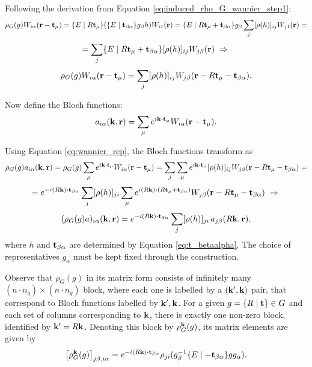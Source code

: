 Following the derivation from Equation \ref{eq:induced_rho_G_wannier_step1}:
$$
\rho_G(g) W_{i\alpha}({\vb{r}}-{\vb{t}}_\mu) =
\{ E \mid R{\vb{t}}_\mu \} \qty(\{ E \mid {\vb{t}}_{\beta\alpha} \} g_\beta h) W_{i1}({\vb{r}}) =
\{ E \mid R{\vb{t}}_\mu + {\vb{t}}_{\beta\alpha} \} g_\beta \sum_{j} [\rho(h)]_{ij} W_{j1}({\vb{r}}) =
$$
$$
= \sum_{j} \{ E \mid R{\vb{t}}_\mu + {\vb{t}}_{\beta\alpha} \} [\rho(h)]_{ij} W_{j\beta}({\vb{r}}) \; \Rightarrow \;
$$
\begin{equation} \label{eq:wannier_rep}
\rho_G(g) W_{i\alpha}({\vb{r}}-{\vb{t}}_\mu) = \sum_{j} [\rho(h)]_{ij} W_{j\beta}({\vb{r}} - R{\vb{t}}_\mu - {\vb{t}}_{\beta\alpha}).
\end{equation}

\n

Now define the Bloch functions:
\begin{equation} \label{eq:bloch_functions}
a_{i\alpha}(\k, \r) = \sum_{\mu} e^{i\k\vdot\t_\mu} W_{i\alpha}(\r-\t_\mu).
\end{equation}

Using Equation \ref{eq:wannier_rep}, the Bloch functions transform as
$$
\rho_G(g) a_{i\alpha}(\k,\r) =
\rho_G(g) \sum_{\mu} e^{i\k\vdot\t_\mu} W_{i\alpha}(\r-\t_\mu) =
\sum_{j} \sum_{\mu} e^{i\k\vdot\t_\mu} [\rho(h)]_{ij} W_{j\beta}(\r-R\t_\mu-\t_{\beta\alpha}) =
$$
$$
= e^{-i(R\k)\vdot\t_{\beta\alpha}} \sum_{j} [\rho(h)]_{ji} \sum_{\mu} e^{i(R\k)\vdot(R\t_\mu+\t_{\beta\alpha})} W_{j\beta}(\r-R\t_\mu-\t_{\beta\alpha}) \implies
$$
\begin{equation} \label{eq:bloch_rep}
(\rho_G(g) a)_{i\alpha}(\k,\r) = e^{-i(R\k)\vdot\t_{\beta\alpha}} \sum_{j} [\rho(h)]_{ji} \, a_{j\beta}(R\k, \r),
\end{equation}
where $h$ and ${\vb{t}}_{\beta\alpha}$ are determined by Equation \ref{eq:t_betaalpha}. The choice of representatives $g_\alpha$ must be kept fixed through the construction.

Observe that $\rho_G(g)$ in its matrix form consists of infinitely many $(n\cdot n_q)\times (n\cdot n_q)$ block, where each one is labelled by a $({\vb{k}}', {\vb{k}})$ pair, that correspond to Bloch functions labelled by ${\vb{k}}', {\vb{k}}$. For a given $g = \{ R \mid {\vb{t}} \} \in G$ and each set of columns corresponding to ${\vb{k}}$, there is exactly one non-zero block, identified by ${\vb{k}}' = R{\vb{k}}$. Denoting this block by $\rho_G^{\vb{k}}(g)$, its matrix elements are given by
\begin{equation} \label{eq:k_block_inducedrep_jbia}
\qty[\rho_G^\k(g)]_{j\beta,i\alpha} = e^{-i(R\k)\vdot\t_{\beta\alpha}}\rho_{ji}(g_\beta^{-1}\sg{E}{-\t_{\beta\alpha}}gg_\alpha).
\end{equation}

